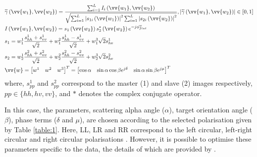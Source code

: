 \documentclass[review]{elsarticle}
\numberwithin{equation}{section}
\numberwithin{figure}{section}
\numberwithin{table}{section}
\begin{document}
\begin{subequations}
    \centering
    \begin{align}
        \label{seq:coh} 
        & \widetilde{\gamma}\left(\vv{w_1}, \vv{w_2}\right) = \frac{\sum_{i=1}^LI_i\left(\vv{w_1}, \vv{w_2}\right)}{\sqrt{\sum_{i=1}^L\left\lvert s_{1i}\left(\vv{w_1}\right)\right\rvert^2\sum_{i=1}^L\left\lvert s_{2i}\left(\vv{w_2}\right)\right\rvert^2}}, \left\lvert\widetilde{\gamma}\left(\vv{w_1}, \vv{w_2}\right)\right\rvert  \in [0, 1] \\
        \label{seq:ifg} 
        & I\left(\vv{w_1}, \vv{w_2}\right) = s_1\left(\vv{w_2}\right)s_2^*\left(\vv{w_2}\right)e^{-j\phi_{flat}^w} \\
        \label{seq:s1} 
        & s_1 = w_1^1\frac{s_{hh}^1 + s_{vv}^1}{\sqrt{2}} + w_1^2\frac{s_{hh}^1 - s_{vv}^1}{\sqrt{2}} + w_1^3\sqrt{2}s_{hv}^1 \\
        \label{seq:s2} 
        & s_2 = w_2^1\frac{s_{hh}^2 + s_{vv}^2}{\sqrt{2}} + w_2^2\frac{s_{hh}^2 - s_{vv}^2}{\sqrt{2}} + w_2^3\sqrt{2}s_{hv}^2 \\
        \label{seq:weight}
        & \vv{w} = \begin{bmatrix}
                    w^1 & w^2 & w^3
                    \end{bmatrix}^T = \begin{bmatrix}
                    \cos\alpha & \sin\alpha \cos{\beta{e}^{j\delta}} & \sin\alpha\sin{\beta{e}^{j\mu}}
                    \end{bmatrix}^T
    \end{align}
\end{subequations}
where, $s_{pp}^1$ and $s_{pp}^2$ correspond to the master (1) and slave (2) images respectively, $pp \in \{hh, hv, vv\}$,
and $*$ denotes the complex conjugate operator.

In this case, the parameters, scattering alpha angle ($\alpha$), target orientation angle ($\beta$), phase terms ($\delta$ and $\mu$), are chosen according to the selected polarisation given by Table \ref{table:1}. Here, LL, LR and RR correspond to
the left circular, left-right circular and right circular polarisations \citep{Cloude2010}. However, it is possible to
optimise these parameters specific to the data, the details of which are provided by \cite{Cloude2010}.
\end{document}
